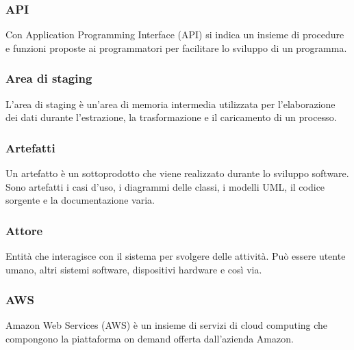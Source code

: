 \subsubsection*{API}
Con Application Programming Interface (API) si indica un insieme di procedure e funzioni proposte ai programmatori per facilitare lo sviluppo di un programma.

\subsubsection*{Area di staging}
L'area di staging è un'area di memoria intermedia utilizzata per l'elaborazione dei dati durante l'estrazione, la trasformazione e il caricamento di un processo.

\subsubsection*{Artefatti}
Un artefatto è un sottoprodotto che viene realizzato durante lo sviluppo software. Sono artefatti i casi d'uso, i diagrammi delle classi, i modelli UML\glo, il codice sorgente e la documentazione varia.

\subsubsection*{Attore}
Entità che interagisce con il sistema per svolgere delle attività. Può essere utente umano, altri sistemi software, dispositivi hardware e così via.

\subsubsection*{AWS}
Amazon Web Services (AWS) è un insieme di servizi di cloud computing che compongono la piattaforma on demand offerta dall’azienda Amazon.

